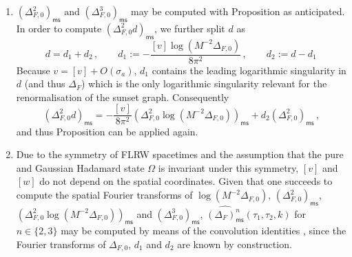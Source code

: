 \documentclass[10pt]{book}
\newcommand{\ms}{\mathsf{ms}}
\theoremstyle{break}
\begin{document}
\begin{enumerate}
\item $\left(\Delta^2_{F,0}\right)_\ms$ and  $\left(\Delta^3_{F,0}\right)_\ms$ may be computed with Proposition %
as anticipated. In order to compute $\left(\Delta^2_{F,0} d\right)_\ms$, we further split $d$ as
\begin{equation}%
d=d_1+d_2\,,\qquad d_1:= -\frac{[v] \log \left(M^{-2} \Delta_{F,0}\right)}{8\pi^2}\,,\qquad d_2:=d-d_1\, \end{equation}
Because $v=[v]+O(\sigma_a)$, $d_1$ contains the leading logarithmic singularity in $d$ (and thus $\Delta_F$) which is the only logarithmic singularity relevant for the renormalisation of the sunset graph. Consequently
%
\begin{equation}%
\left(\Delta^2_{F,0} d\right)_\ms=- \frac{[v]}{8\pi^2}\left(\Delta^2_{F,0}\log \left(M^{-2} \Delta_{F,0}\right)\right)_\ms + d_2 \left(\Delta^2_{F,0}\right)_\ms\,,\end{equation}
%
and thus Proposition %
can be applied again.
\item Due to the symmetry of FLRW spacetimes and the assumption that the pure and Gaussian Hadamard state $\Omega$ is invariant under this symmetry, $[v]$ and $[w]$ do not depend on the spatial coordinates. Given that one succeeds to compute the spatial Fourier transforms of $\log \left(M^{-2} \Delta_{F,0}\right)$, $\left(\Delta^2_{F,0}\right)_\ms$, $\left(\Delta^2_{F,0}\log \left(M^{-2} \Delta_{F,0}\right)\right)_\ms$ and  $\left(\Delta^3_{F,0}\right)_\ms$, $\widehat{(\Delta_{F})^n_\ms}(\tau_1,\tau_2,k)$ for $n\in\{2,3\}$ may be computed by means of the convolution identities %
, since the Fourier transforms of $\Delta_{F,0}$, $d_1$ and $d_2$ are known by construction.
\end{enumerate}
\end{document}

